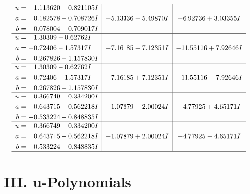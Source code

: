 \documentclass[1p]{elsarticle_modified}
\theoremstyle{definition}
\begin{document}
$$\begin{array}{c|c|c}
\begin{aligned}
u &= -1.113620 - 0.821105 I \\
a &= \phantom{-}0.182578 + 0.708726 I \\
b &= \phantom{-}0.078004 + 0.709017 I\end{aligned}
 & -5.13336 - 5.49870 I & -6.92736 + 3.03355 I \\ \hline\begin{aligned}
u &= \phantom{-}1.30309 + 0.62762 I \\
a &= -0.72406 - 1.57317 I \\
b &= \phantom{-}0.267826 - 1.157830 I\end{aligned}
 & -7.16185 - 7.12351 I & -11.55116 + 7.92646 I \\ \hline\begin{aligned}
u &= \phantom{-}1.30309 - 0.62762 I \\
a &= -0.72406 + 1.57317 I \\
b &= \phantom{-}0.267826 + 1.157830 I\end{aligned}
 & -7.16185 + 7.12351 I & -11.55116 - 7.92646 I \\ \hline\begin{aligned}
u &= -0.366749 + 0.334200 I \\
a &= \phantom{-}0.643715 - 0.562218 I \\
b &= -0.533224 + 0.848835 I\end{aligned}
 & -1.07879 - 2.00024 I & -4.77925 + 4.65171 I \\ \hline\begin{aligned}
u &= -0.366749 - 0.334200 I \\
a &= \phantom{-}0.643715 + 0.562218 I \\
b &= -0.533224 - 0.848835 I\end{aligned}
 & -1.07879 + 2.00024 I & -4.77925 - 4.65171 I\\
 \hline 
 \end{array}$$\newpage
\newpage\renewcommand{\arraystretch}{1}
\centering \section*{ III. u-Polynomials}
\end{document}
